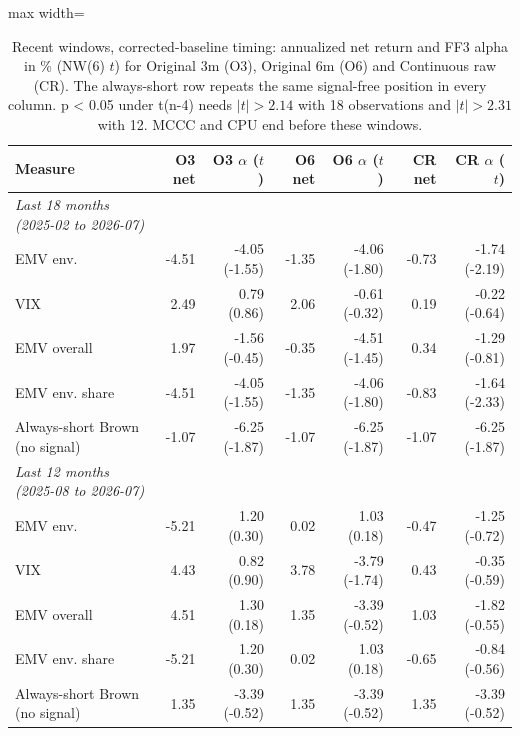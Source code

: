 \begin{table}[H]
\centering\footnotesize
\caption{Recent windows, corrected-baseline timing: annualized net return and FF3 alpha in \% (NW(6) $t$) for Original 3m (O3), Original 6m (O6) and Continuous raw (CR). The always-short row repeats the same signal-free position in every column. p < 0.05 under t(n-4) needs $|t| > 2.14$ with 18 observations and $|t| > 2.31$ with 12. MCCC and CPU end before these windows.}
\label{tab:m1b_recent}
\begin{adjustbox}{max width=\linewidth}
\begin{tabular}{lrrrrrr}
\toprule
Measure & O3 net & O3 $\alpha$ ($t$) & O6 net & O6 $\alpha$ ($t$) & CR net & CR $\alpha$ ($t$) \\
\midrule
\textit{Last 18 months (2025-02 to 2026-07)} &  &  &  &  &  &  \\
EMV env. & -4.51 & -4.05 (-1.55) & -1.35 & -4.06 (-1.80) & -0.73 & -1.74 (-2.19) \\
VIX & 2.49 & 0.79 (0.86) & 2.06 & -0.61 (-0.32) & 0.19 & -0.22 (-0.64) \\
EMV overall & 1.97 & -1.56 (-0.45) & -0.35 & -4.51 (-1.45) & 0.34 & -1.29 (-0.81) \\
EMV env. share & -4.51 & -4.05 (-1.55) & -1.35 & -4.06 (-1.80) & -0.83 & -1.64 (-2.33) \\
Always-short Brown (no signal) & -1.07 & -6.25 (-1.87) & -1.07 & -6.25 (-1.87) & -1.07 & -6.25 (-1.87) \\
\textit{Last 12 months (2025-08 to 2026-07)} &  &  &  &  &  &  \\
EMV env. & -5.21 & 1.20 (0.30) & 0.02 & 1.03 (0.18) & -0.47 & -1.25 (-0.72) \\
VIX & 4.43 & 0.82 (0.90) & 3.78 & -3.79 (-1.74) & 0.43 & -0.35 (-0.59) \\
EMV overall & 4.51 & 1.30 (0.18) & 1.35 & -3.39 (-0.52) & 1.03 & -1.82 (-0.55) \\
EMV env. share & -5.21 & 1.20 (0.30) & 0.02 & 1.03 (0.18) & -0.65 & -0.84 (-0.56) \\
Always-short Brown (no signal) & 1.35 & -3.39 (-0.52) & 1.35 & -3.39 (-0.52) & 1.35 & -3.39 (-0.52) \\
\bottomrule
\end{tabular}
\end{adjustbox}
\end{table}

